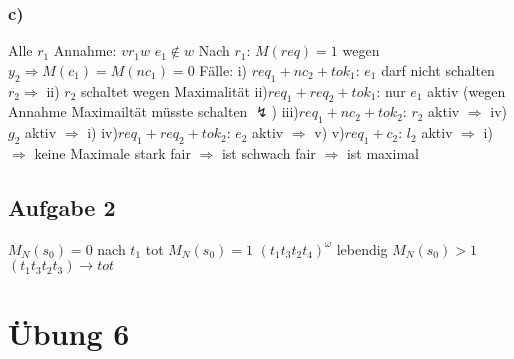 \documentclass[12pt]{scrreprt}
\begin{document}
\subsubsection*{c)}
Alle $r_1$\newline
Annahme:				\tabto{2.5cm}$v r_1 w$ $e_1 \notin w$\newline
Nach $r_1$:				\tabto{2.5cm}$M(req)=1$ wegen $y_2 \Rightarrow M(c_1)=M(nc_1)=0$\newline
Fälle:	\tabto{1.5cm}i)	\tabto{2.5cm}$req_1 + nc_2 + tok_1$: $e_1$ darf nicht schalten\newline
						\tabto{2.5cm}$r_2 \Rightarrow$ ii) $r_2$ schaltet wegen Maximalität\newline
		\tabto{1.5cm}ii)\tabto{2.5cm}$req_1 + req_2 + tok_1$: nur $e_1$ aktiv\newline
						\tabto{2.5cm}(wegen Annahme Maximailtät müsste schalten $\lightning$)\newline
		\tabto{1.5cm}iii)\tabto{2.5cm}$req_1 + nc_2 + tok_2$: $r_2$ aktiv $\Rightarrow$ iv) $g_2$ aktiv $\Rightarrow$ i)\newline
		\tabto{1.5cm}iv)\tabto{2.5cm}$req_1 + req_2 + tok_2$: $e_2$ aktiv $\Rightarrow$ v)\newline
		\tabto{1.5cm}v)\tabto{2.5cm}$req_1 + c_2$: $l_2$ aktiv $\Rightarrow$ i)\newline
$\Rightarrow$ keine Maximale\newline
stark fair $\Rightarrow$ ist schwach fair $\Rightarrow$ ist maximal

\subsection*{Aufgabe 2}
$M_N(s_0)=0$ nach $t_1$ tot\newline
$M_N(s_0)=1$ $(t_1 t_3 t_2 t_4)^\omega$ lebendig\newline
$M_N(s_0)>1$ $(t_1 t_3 t_2 t_3) \rightarrow tot$\newline

\section{Übung 6}
\end{document}
